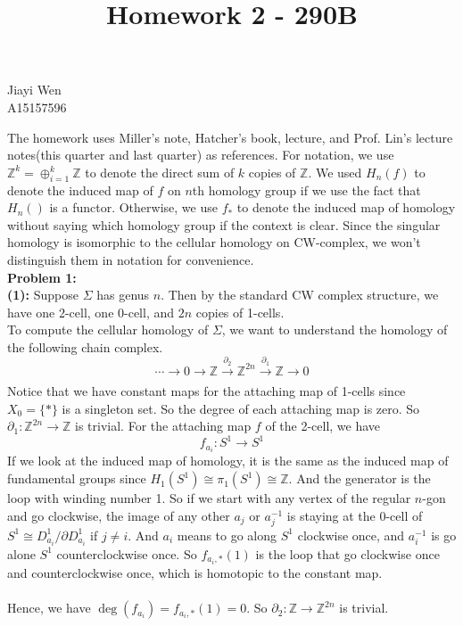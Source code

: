 \documentclass[12pt]{amsart}
\newcommand{\Z}{\mathbb{Z}}
\begin{document}
\title{Homework 2 - 290B}
\maketitle
\begin{center}
    Jiayi Wen\\
    A15157596
\end{center}
The homework uses Miller's note, Hatcher's book, lecture, and Prof. Lin's lecture notes(this quarter and last quarter) as references. For notation, we use $\Z^k=\oplus_{i=1}^k\Z$ to denote the direct sum of $k$ copies of $\Z$. We used $H_n(f)$ to denote the induced map of $f$ on $n$th homology group if we use the fact that $H_n()$ is a functor. Otherwise, we use $f_\ast$ to denote the induced map of homology without saying which homology group if the context is clear. Since the singular homology is isomorphic to the cellular homology on CW-complex, we won't distinguish them in notation for convenience.\\
\textbf{Problem 1:}\\
\textbf{(1):} Suppose $\Sigma$ has genus $n$. Then by the standard CW complex structure, we have one 2-cell, one 0-cell, and $2n$ copies of 1-cells.\\
\vspace{4cm}
To compute the cellular homology of $\Sigma$, we want to understand the homology of the following chain complex.
\[\cdots\to0\to\Z\xrightarrow[]{\partial_2}\Z^{2n}\xrightarrow[]{\partial_1}\Z\to 0 \]
Notice that we have constant maps for the attaching map of 1-cells since $X_0=\{\ast\}$ is a singleton set. So the degree of each attaching map is zero. So $\partial_1:\Z^{2n}\to \Z$ is trivial. For the attaching map $f$ of the 2-cell, we have 
\[f_{a_i}:S^1\to S^1\]
If we look at the induced map of homology, it is the same as the induced map of fundamental groups since $H_1(S^1)\cong \pi_1(S^1)\cong \Z$. And the generator is the loop with winding number 1. So if we start with any vertex of the regular $n$-gon and go clockwise, the image of any other $a_j$ or $a_j^{-1}$ is staying at the 0-cell of $S^1\cong D^1_{a_i}/\partial D^1_{a_i}$ if $j\neq i$. And $a_i$ means to go along $S^1$ clockwise once, and $a_i^{-1}$ is go alone $S^1$ counterclockwise once. So $f_{a_i,\ast}(1)$ is the loop that go clockwise once and counterclockwise once, which is homotopic to the constant map. 
\pagebreak
\\\vspace{6cm}\\
Hence, we have $\deg(f_{a_i})=f_{a_i,\ast}(1)=0$. So $\partial_2:\Z\to \Z^{2n}$ is trivial.
\end{document}

